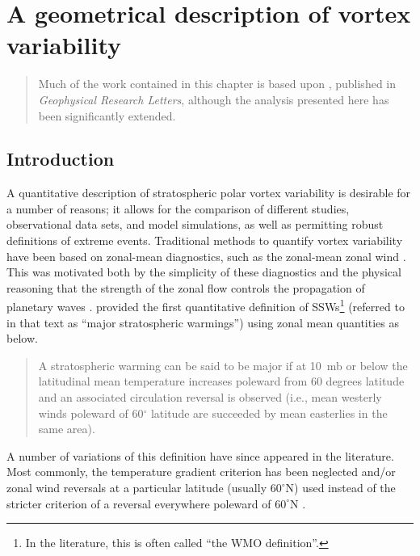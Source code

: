\chapter{A geometrical description of vortex variability}
\begin{quotation}
  Much of the work contained in this chapter is based upon \citet{Seviour2013a},
  published in \emph{Geophysical Research Letters}, although the analysis
  presented here has been significantly extended.
\end{quotation}

\label{cha:moments}




\section{Introduction}

A quantitative description of stratospheric polar vortex variability is
desirable for a number of reasons; it allows for the comparison of different
studies, observational data sets, and model simulations, as well as permitting
robust definitions of extreme events.  Traditional methods to quantify vortex
variability have been based on zonal-mean diagnostics, such as the zonal-mean
zonal wind \citep[e.g.,][]{Andrews1987}. This was motivated both by the
simplicity of these diagnostics and the physical reasoning that the strength of
the zonal flow controls the propagation of planetary waves \citep[][Section
\ref{sec:plan-waves-strat}]{Charney1961}. \citet{McInturff1978} provided the
first quantitative definition of SSWs\footnote{In the literature, this is often
  called ``the WMO definition''.} (referred to in that text as ``major
stratospheric warmings'') using zonal mean quantities as below.
\begin{quotation}
A stratospheric warming can be said to be major if at 10~mb or below the
latitudinal mean temperature increases poleward from 60 degrees latitude and an
associated circulation reversal is observed (i.e., mean westerly winds poleward
of 60$^{\circ}$ latitude are succeeded by mean easterlies in the same area).
\end{quotation}
A number of variations of this definition have since appeared in the
literature. Most commonly, the temperature gradient criterion has been neglected
and/or zonal wind reversals at a particular latitude (usually $60^{\circ}$N)
used instead of the stricter criterion of a reversal everywhere poleward of
$60^{\circ}$N \citep[e.g.,][]{Labitzke2000, Christiansen2001,
  Reichler2012}. 

